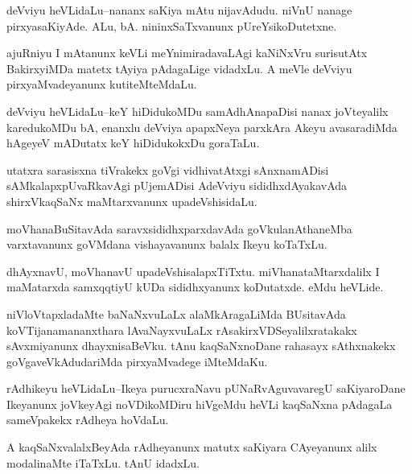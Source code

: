\documentclass{article}
\begin{document}
\begin{mn}%
deVviyu heVLidaLu--nananx saKiya mAtu nijavAdudu. niVnU nanage pirxyasaKiyAde. ALu, bA. 
nininxSaTxvanunx pUreYsikoDutetxne.
\end{mn}

\begin{mn}%
ajuRniyu I mAtanunx keVLi meYnimiradavaLAgi kaNiNxVru surisutAtx BakirxyiMDa matetx tAyiya 
pAdagaLige vidadxLu. A meVle deVviyu pirxyaMvadeyanunx kutiteMteMdaLu.
\end{mn}

\begin{mn}%
deVviyu heVLidaLu--keY hiDidukoMDu samAdhAnapaDisi nanax  joVteyalilx karedukoMDu bA, enanxlu
deVviya apapxNeya parxkAra Akeyu avasaradiMda hAgeyeV mADutatx keY hiDidukokxDu goraTaLu.
\end{mn}

\begin{mn}%
utatxra sarasisxna tiVrakekx goVgi vidhivatAtxgi sAnxnamADisi sAMkalapxpUvaRkavAgi 
pUjemADisi AdeVviyu sididhxdAyakavAda shirxVkaqSaNx maMtarxvanunx upadeVshisidaLu.
\end{mn}

\begin{mn}%
moVhanaBuSitavAda saravxsididhxparxdavAda goVkulanAthaneMba varxtavanunx goVMdana 
vishayavanunx balalx Ikeyu koTaTxLu.
\end{mn}

\begin{mn}%
dhAyxnavU, moVhanavU upadeVshisalapxTiTxtu. miVhanataMtarxdalilx I maMatarxda samxqqtiyU 
kUDa sididhxyanunx koDutatxde. eMdu heVLide. 
\end{mn}

\begin{mn}%
niVloVtapxladaMte baNaNxvuLaLx alaMkAragaLiMda BUsitavAda koVTijanamananxthara 
lAvaNayxvuLaLx rAsakirxVDSeyalilxratakakx sAvxmiyanunx dhayxnisaBeVku. tAnu kaqSaNxnoDane 
rahasayx sAthxnakekx goVgaveVkAdudariMda pirxyaMvadege iMteMdaKu.
\end{mn}

\begin{mn}%
rAdhikeyu heVLidaLu--Ikeya purucxraNavu pUNaRvAguvavaregU saKiyaroDane Ikeyanunx joVkeyAgi 
noVDikoMDiru hiVgeMdu heVLi kaqSaNxna pAdagaLa sameVpakekx rAdheya hoVdaLu.
\end{mn}

\begin{mn}%
A kaqSaNxvalalxBeyAda rAdheyanunx matutx saKiyara CAyeyanunx alilx modalinaMte  iTaTxLu. 
tAnU idadxLu.
\end{mn}
\end{document}
